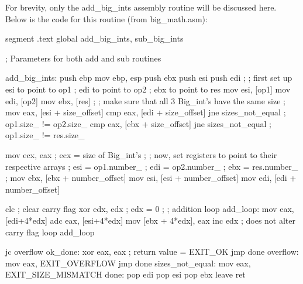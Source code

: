 For brevity, only the {\code add\_big\_ints} assembly routine will be discussed
here. Below is the code for this routine (from {\code big\_math.asm}):
\begin{AsmCodeListing}[label=big\_math.asm]
segment .text
        global  add_big_ints, sub_big_ints


; Parameters for both add and sub routines

add_big_ints:
        push    ebp
        mov     ebp, esp
        push    ebx
        push    esi
        push    edi
        ;
        ; first set up esi to point to op1
        ;              edi to point to op2
        ;              ebx to point to res
        mov     esi, [op1]
        mov     edi, [op2]
        mov     ebx, [res]
        ;
        ; make sure that all 3 Big_int's have the same size
        ;
        mov     eax, [esi + size_offset]
        cmp     eax, [edi + size_offset]
        jne     sizes_not_equal                 ; op1.size_ != op2.size_
        cmp     eax, [ebx + size_offset]
        jne     sizes_not_equal                 ; op1.size_ != res.size_

        mov     ecx, eax                        ; ecx = size of Big_int's
        ;
        ; now, set registers to point to their respective arrays
        ;      esi = op1.number_
        ;      edi = op2.number_
        ;      ebx = res.number_
        ;
        mov     ebx, [ebx + number_offset]
        mov     esi, [esi + number_offset]
        mov     edi, [edi + number_offset]
        
        clc                                     ; clear carry flag
        xor     edx, edx                        ; edx = 0
        ;
        ; addition loop
add_loop:
        mov     eax, [edi+4*edx]
        adc     eax, [esi+4*edx]
        mov     [ebx + 4*edx], eax
        inc     edx                             ; does not alter carry flag
        loop    add_loop

        jc      overflow
ok_done:
        xor     eax, eax                        ; return value = EXIT_OK
        jmp     done
overflow:
        mov     eax, EXIT_OVERFLOW
        jmp     done
sizes_not_equal:
        mov     eax, EXIT_SIZE_MISMATCH
done:
        pop     edi
        pop     esi
        pop     ebx
        leave
        ret
\end{AsmCodeListing}

